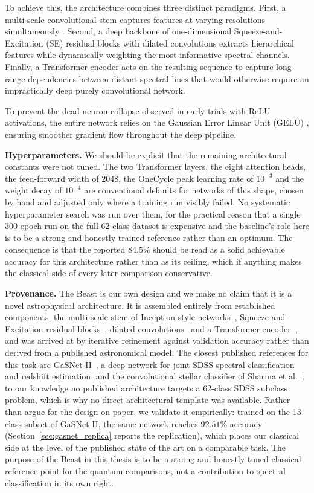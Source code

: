 To achieve this, the architecture combines three distinct paradigms. First, a multi-scale convolutional stem captures features at varying resolutions simultaneously \cite{szegedy2015going}. Second, a deep backbone of one-dimensional Squeeze-and-Excitation (SE) residual blocks \cite{hu2019squeeze} with dilated convolutions \cite{yu2016dilated} extracts hierarchical features while dynamically weighting the most informative spectral channels. Finally, a Transformer encoder \cite{vaswani2017attention} acts on the resulting sequence to capture long-range dependencies between distant spectral lines that would otherwise require an impractically deep purely convolutional network.

To prevent the dead-neuron collapse observed in early trials with ReLU activations, the entire network relies on the Gaussian Error Linear Unit (GELU) \cite{hendrycks2016gaussian}, ensuring smoother gradient flow throughout the deep pipeline.

\textbf{Hyperparameters.} We should be explicit that the remaining architectural
constants were not tuned. The two Transformer layers, the eight attention heads, the
feed-forward width of 2048, the OneCycle peak learning rate of $10^{-3}$ and the weight
decay of $10^{-4}$ are conventional defaults for networks of this shape, chosen by hand
and adjusted only where a training run visibly failed. No systematic hyperparameter
search was run over them, for the practical reason that a single 300-epoch run on the
full 62-class dataset is expensive and the baseline's role here is to be a strong and
honestly trained reference rather than an optimum. The consequence is that the reported
$84.5\%$ should be read as a solid achievable accuracy for this architecture rather than
as its ceiling, which if anything makes the classical side of every later comparison
conservative.

\textbf{Provenance.} The Beast is our own design and we make no claim that it is a novel
astrophysical architecture. It is assembled entirely from established components, the
multi-scale stem of Inception-style networks~\cite{szegedy2015going}, Squeeze-and-Excitation
residual blocks~\cite{hu2019squeeze}, dilated convolutions~\cite{yu2016dilated} and a
Transformer encoder~\cite{vaswani2017attention}, and was arrived at by iterative refinement
against validation accuracy rather than derived from a published astronomical model. The
closest published references for this task are GaSNet-II~\cite{zhong2024gasnet}, a deep
network for joint SDSS spectral classification and redshift estimation, and the
convolutional stellar classifier of Sharma et al.~\cite{sharma2020cnn}; to our knowledge no
published architecture targets a 62-class SDSS subclass problem, which is why no direct
architectural template was available. Rather than argue for the design on paper, we validate
it empirically: trained on the 13-class subset of GaSNet-II, the same network reaches
$92.51\%$ accuracy (Section~\ref{sec:gasnet_replica} reports the replication), which places
our classical side at the level of the published state of the art on a comparable task. The
purpose of the Beast in this thesis is to be a strong and honestly tuned classical reference
point for the quantum comparisons, not a contribution to spectral classification in its own
right.

